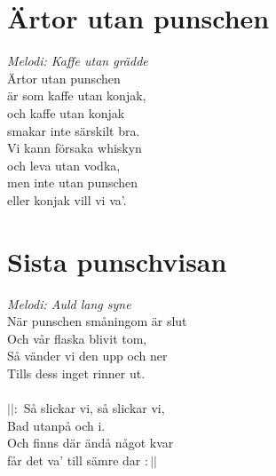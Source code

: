 \section{Ärtor utan punschen}
\textit{Melodi: Kaffe utan grädde}
\vspace{2mm}\\
Ärtor utan punschen\\
är som kaffe utan konjak,\\
och kaffe utan konjak\\
smakar inte särskilt bra.\\
Vi kann försaka whiskyn\\
och leva utan vodka,\\
men inte utan punschen\\
eller konjak vill vi va'.

\section{Sista punschvisan}
\textit{Melodi: Auld lang syne}
\vspace{2mm}\\
När punschen småningom är slut\\
Och vår flaska blivit tom,\\
Så vänder vi den upp och ner\\
Tills dess inget rinner ut.\\
\\
$||:$ Så slickar vi, så slickar vi,\\
Bad utanpå och i.\\
Och finns där ändå något kvar\\
får det va' till sämre dar $:||$
